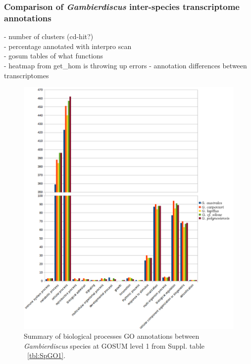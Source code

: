 \documentclass[12pt]{article}
\begin{document}
\subsubsection*{Comparison of \emph{Gambierdiscus} inter-species transcriptome annotations}
- number of clusters (cd-hit?)\\
- percentage annotated with interpro scan\\
- gosum tables of what functions\\
- heatmap from get\_hom is throwing up errors
- annotation differences between transcriptomes
\begin{figure} 
\includegraphics[scale=.7]{3Aug18_cluster-investigation/figures/gosum-species/Species-gosum1-bio-split.png} 
\caption{Summary of biological processes GO annotations between \textit{Gambierdiscus} species at GOSUM level 1 from Suppl. table ~\ref{tbl:SpGO1}.} 
\label{fig:SpecGo1Bio}
\end{figure} 
\FloatBarrier
\end{document}
